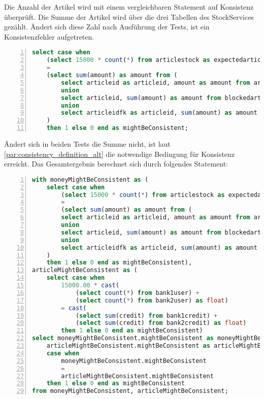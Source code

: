 Die Anzahl der Artikel wird mit einem vergleichbaren Statement auf Konsistenz überprüft. Die Summe der Artikel wird über die drei Tabellen des StockServices gezählt. Ändert sich diese Zahl nach Ausführung der Tests, ist ein Konsistenzfehler aufgetreten.

\begin{lstlisting}[language=SQL, breaklines=true, tabsize=2, showstringspaces=false, frame=single, numbers=left, basicstyle=\small] 
select case when 
	(select 15000 * count(*) from articlestock as expectedarticlesum) 
	= 
	(select sum(amount) as amount from (
		select articleid as articleid, amount as amount from articlestock
		union
		select articleid, sum(amount) as amount from blockedarticles group by articleid
		union
		select articleidfk as articleid, sum(amount) as amount from shippedarticles group by articleidfk) as actualarticlesum
	)
	then 1 else 0 end as mightBeConsistent;
\end{lstlisting}\label{}

Ändert sich in beiden Tests die Summe nicht, ist laut \cref{par:consistency_definition_alt} die notwendige Bedingung für Konsistenz erreicht. Das Gesamtergebnis berechnet sich durch folgendes Statement:
\begin{lstlisting}[language=SQL, breaklines=true, tabsize=2, showstringspaces=false, frame=single, numbers=left, basicstyle=\small] 
with moneyMightBeConsistent as (
	select case when 
		(select 15000 * count(*) from articlestock as expectedarticlesum) 
		= 
		(select sum(amount) as amount from (
		select articleid as articleid, amount as amount from articlestock
		union
		select articleid, sum(amount) as amount from blockedarticles group by articleid
		union
		select articleidfk as articleid, sum(amount) as amount from shippedarticles group by articleidfk) as actualarticlesum
	)
	then 1 else 0 end as mightBeConsistent),
articleMightBeConsistent as (
	select case when 
		15000.00 * cast(
			(select count(*) from bank1user) + 
			(select count(*) from bank2user) as float) 
		= cast(
			(select sum(credit) from bank1credit) + 
			(select sum(credit) from bank2credit) as float)
		then 1 else 0 end as mightBeConsistent) 
select moneyMightBeConsistent.mightBeConsistent as moneyMightBeConsistent,
	articleMightBeConsistent.mightBeConsistent as articleMightBeConsistent,
	case when 
		moneyMightBeConsistent.mightBeConsistent 
		= 
		articleMightBeConsistent.mightBeConsistent 
	then 1 else 0 end as mightBeConsistent
from moneyMightBeConsistent, articleMightBeConsistent;
\end{lstlisting}\label{}

